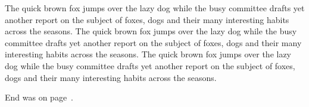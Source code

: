 \documentclass{article}
\begin{document}
The quick brown fox jumps over the lazy dog while the busy committee drafts yet another report on the subject of foxes, dogs and their many interesting habits across the seasons. The quick brown fox jumps over the lazy dog while the busy committee drafts yet another report on the subject of foxes, dogs and their many interesting habits across the seasons. The quick brown fox jumps over the lazy dog while the busy committee drafts yet another report on the subject of foxes, dogs and their many interesting habits across the seasons. 

End was on page~\pageref{end}.
\end{document}
